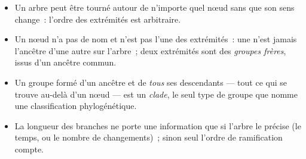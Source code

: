 \begin{proposition}\label{prop:g12:phylogenetic-trees:rules}
\begin{itemize}
  \item Un arbre peut être tourné autour de n'importe quel nœud sans
        que son sens change~: l'ordre des extrémités est arbitraire.
  \item Un nœud n'a pas de nom et n'est pas l'une des extrémités~: une
         n'est jamais l'ancêtre d'une autre  sur l'arbre~;
        deux extrémités sont des \emph{groupes frères}, issus d'un
        ancêtre commun.
  \item Un groupe formé d'un ancêtre et de \emph{tous} ses
        descendants --- tout ce qui se trouve au-delà d'un
        nœud --- est un \emph{clade}, le seul type de
        groupe que nomme une classification phylogénétique.
  \item La longueur des branches ne porte une information que si
        l'arbre le précise (le temps, ou le nombre de changements)~;
        sinon seul l'ordre de ramification compte.
\end{itemize}
\end{proposition}
\admitted

